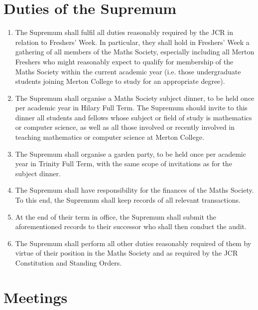 \documentclass[pdftex,a4paper]{report}
\begin{document}
\section*{Duties of the Supremum}

\begin{enumerate}[resume*]
	\item The Supremum shall fulfil all duties reasonably required by the JCR in relation to Freshers' Week. In particular, they shall hold in Freshers' Week a gathering of all members of the Maths Society, especially including all Merton Freshers who might reasonably expect to qualify for membership of the Maths Society within the current academic year (i.e. those undergraduate students joining Merton College to study for an appropriate degree).
	\item The Supremum shall organise a Maths Society subject dinner, to be held once per academic year in Hilary Full Term. The Supremum should invite to this dinner all students and fellows whose subject or field of study is mathematics or computer science, as well as all those involved or recently involved in teaching mathematics or computer science at Merton College.
	\item The Supremum shall organise a garden party, to be held once per academic year in Trinity Full Term, with the same scope of invitations as for the subject dinner.
	\item The Supremum shall have responsibility for the finances of the Maths Society. To this end, the Supremum shall keep records of all relevant transactions.
	\item At the end of their term in office, the Supremum shall submit the aforementioned records to their successor who shall then conduct the audit.
	\item The Supremum shall perform all other duties reasonably required of them by virtue of their position in the Maths Society and as required by the JCR Constitution and Standing Orders.
\end{enumerate}


\section*{Meetings}
\end{document}
